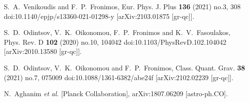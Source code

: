 \documentclass[aps,prd,twocolumn,groupedaddress,showpacs,nofootinbib,amssymb]{revtex4-2}
\begin{document}
\begin{thebibliography}{99}
S.~A.~Venikoudis and F.~P.~Fronimos,
Eur. Phys. J. Plus \textbf{136} (2021) no.3, 308
doi:10.1140/epjp/s13360-021-01298-y
[arXiv:2103.01875 [gr-qc]].
























S.~D.~Odintsov, V.~K.~Oikonomou, F.~P.~Fronimos and K.~V.~Fasoulakos,
Phys. Rev. D \textbf{102} (2020) no.10, 104042
doi:10.1103/PhysRevD.102.104042
[arXiv:2010.13580 [gr-qc]].

S.~D.~Odintsov, V.~K.~Oikonomou and F.~P.~Fronimos,
Class. Quant. Grav. \textbf{38} (2021) no.7, 075009
doi:10.1088/1361-6382/abe24f
[arXiv:2102.02239 [gr-qc]].










































N.~Aghanim {\it et al.} [Planck Collaboration],
arXiv:1807.06209 [astro-ph.CO].







 





  

 




\end{thebibliography}
\end{document}
